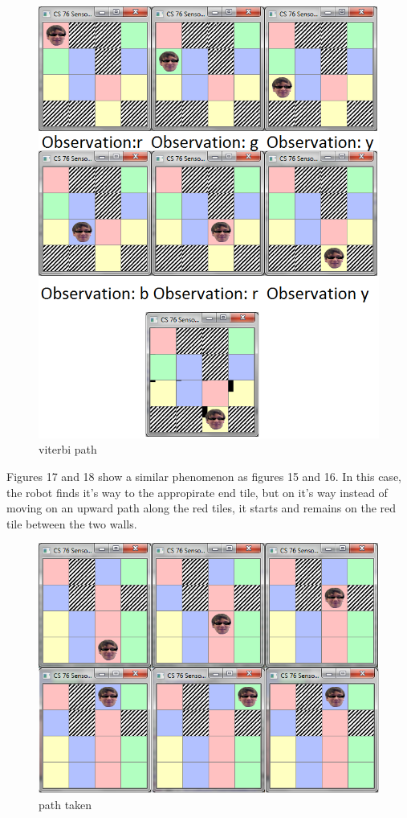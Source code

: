 \documentclass[a4paper]{article}
\begin{document}
\begin{figure}[H]
\centering
\includegraphics[width=1\textwidth]{4x4viterbiUnambiguous.png}
\caption{\label{fig:2x2 maze}viterbi path}
\end{figure}


Figures 17 and 18 show a similar phenomenon as figures 15 and 16. In this case, the robot finds it's way to the appropirate end tile, but on it's way instead of moving on an upward path along the red tiles, it starts and remains on the red tile between the two walls. 

\begin{figure}[H]
\centering
\includegraphics[width=1\textwidth]{viterbiPathwrongTruePath.png}
\caption{\label{fig:2x2 maze}path taken}
\end{figure}
\end{document}
